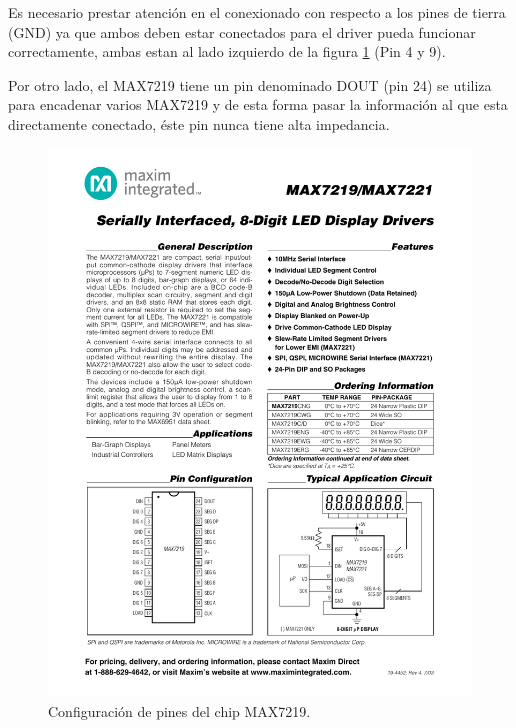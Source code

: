 Es necesario prestar atención en el conexionado con respecto a los pines de tierra (GND) ya que ambos deben estar conectados para el driver pueda funcionar correctamente, ambas estan al lado izquierdo de la figura \ref{fig:MAX-pines} (Pin 4 y 9).

Por otro lado, el MAX7219 tiene un pin denominado DOUT (pin 24) se utiliza para encadenar varios MAX7219 y de esta forma pasar la información al que esta directamente conectado, éste pin nunca tiene alta impedancia.

\begin{figure}[htp!]
	\centering
	\begin{center}
	\includegraphics[scale=1.2]{imagenes/hw/max.pdf}
	 \caption{Configuración de pines del chip MAX7219.}
	  \label{fig:MAX-pines}
	\end{center}
\end{figure}


